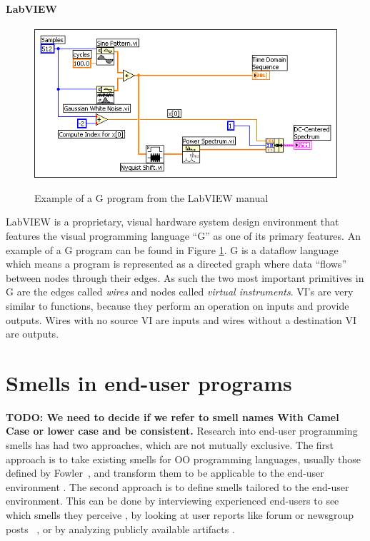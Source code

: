 \documentclass[10pt,conference,compsocconf]{IEEEtran}
\newcommand{\todo}[1]{\textbf{TODO: #1}}
\begin{document}
\paragraph{LabVIEW}
\begin{figure}
\caption{Example of a G program from the LabVIEW manual}
\centering
\includegraphics[width=\columnwidth]{labview-1}
\label{fig:labviewexample}
\end{figure}

LabVIEW is a proprietary, visual hardware system design environment that features the visual programming language ``G'' as one of its primary features.
An example of a G program can be found in Figure \ref{fig:labviewexample}.
G is a dataflow language which means a program is represented as a directed graph where data ``flows'' between nodes through their edges.
As such the two most important primitives in G are the edges called \textit{wires} and nodes called \textit{virtual instruments}.
VI's are very similar to functions, because they perform an operation on inputs and provide outputs.
Wires with no source VI are inputs and wires without a destination VI are outputs. 


\section{Smells in end-user programs}
\label{sec:smells}
\todo{We need to decide if we refer to smell names With Camel Case or lower case and be consistent.}
Research into end-user programming smells has had two approaches, which are not mutually exclusive.
The first approach is to take existing smells for OO programming languages, usually those defined by Fowler~\cite{Fowl1999}, and transform them to be applicable to the end-user environment \cite{Hermans2012inter,Hermans2012intra,Stolee2011,StoleeTSE2013, chambers2013smell}.
The second approach is to define smells tailored to the end-user environment.
This can be done by interviewing experienced end-users to see which smells they perceive \cite{chambers2013smell}, by looking at user reports like forum or newsgroup posts~ \cite{badame2012refactoring,chambers2013smell}, or by analyzing publicly available artifacts \cite{Stolee2011,StoleeTSE2013}.
\end{document}
